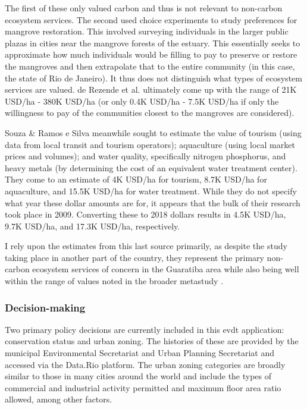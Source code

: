 The first of these only valued carbon and thus is not relevant to non-carbon ecosystem services.  The second used choice experiments to study preferences for mangrove restoration. This involved surveying individuals in the larger public plazas in cities near the mangrove forests of the estuary. This essentially seeks to approximate how much individuals would be filling to pay to preserve or restore the mangroves and then extrapolate that to the entire community (in this case, the state of Rio de Janeiro). It thus does not distinguish what types of ecosystem services are valued. de Rezende et al. ultimately come up with the range of 21K USD/ha - 380K USD/ha (or only 0.4K USD/ha - 7.5K USD/ha if only the willingness to pay of the communities closest to the mangroves are considered).

Souza \& Ramos e Silva meanwhile sought to estimate the value of tourism (using data from local transit and tourism operators); aquaculture (using local market prices and volumes); and water quality, specifically nitrogen phosphorus, and heavy metals (by determining the cost of an equivalent water treatment center). They come to an estimate of 4K USD/ha for tourism, 8.7K USD/ha for aquaculture, and 15.5K USD/ha for water treatment. While they do not specify what year these dollar amounts are for, it appears that the bulk of their research took place in 2009. Converting these to 2018 dollars results in 4.5K USD/ha, 9.7K USD/ha, and 17.3K USD/ha, respectively.

I rely upon the estimates from this last source primarily, as despite the study taking place in another part of the country, they represent the primary non-carbon ecosystem services of concern in the Guaratiba area while also being well within the range of values noted in the broader metastudy \cite{jungGapsMangroveForestInReview}. 

\subsubsection{Decision-making}

Two primary policy decisions are currently included in this \ac{evdt} application: conservation status and urban zoning. The histories of these are provided by the municipal Environmental Secretariat and Urban Planning Secretariat and accessed via the Data.Rio platform. The urban zoning categories are broadly similar to those in many cities around the world and include the types of commercial and industrial activity permitted and maximum floor area ratio allowed, among other factors. 

